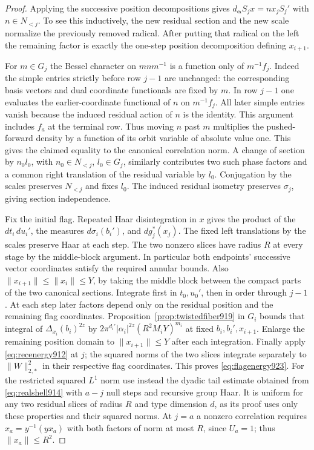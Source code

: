 \documentclass[a4paper,11pt]{article}
\theoremstyle{definition}
\theoremstyle{remark}
\numberwithin{equation}{section}
\begin{document}
\begin{proof}
Applying the successive position decompositions gives
\(d_{\boldsymbol\alpha}S_j x=n x_j S_j'\) with \(n\in N_{<j}\).
To see this inductively, the new residual section and the new
scale normalize the previously removed radical. After putting
that radical on the left the remaining factor is exactly the
one-step position decomposition defining \(x_{i+1}\).

For \(m\in G_j\) the Bessel character on \(m n m^{-1}\) is a
function only of \(m^{-1}f_j\). Indeed the simple entries
strictly before row \(j-1\) are unchanged: the corresponding
basis vectors and dual coordinate functionals are fixed by
\(m\). In row \(j-1\) one evaluates the earlier-coordinate
functional of \(n\) on \(m^{-1}f_j\). All later simple entries
vanish because the induced residual action of \(n\) is the
identity. This argument includes \(f_a\) at the terminal row.
Thus moving \(n\) past \(m\) multiplies the pushed-forward
density by a function of its orbit variable of absolute value
one. This gives the claimed equality to the canonical
correlation norm. A change of section by \(n_0l_0\), with
\(n_0\in N_{<j}\), \(l_0\in G_j\), similarly contributes
two such phase factors and a common right translation of the
residual variable by \(l_0\). Conjugation by the scales preserves
\(N_{<j}\) and fixes \(l_0\). The induced residual isometry
preserves \(\sigma_j\), giving section independence.

Fix the initial flag. Repeated Haar disintegration in \(x\)
gives the product of the \(dt_i\,du_i'\), the measures
\(d\sigma_i(b_i')\), and \(dg_j^*(x_j)\). The fixed left
translations by the scales preserve Haar at each step.
The two nonzero slices have radius \(R\) at every stage by the
middle-block argument. In particular both endpoints' successive
vector coordinates satisfy the required annular bounds.
Also \(\|x_{i+1}\|\le\|x_i\|\le Y\), by taking the middle block
between the compact parts of the two canonical sections.
Integrate first in \(t_0,u_0'\), then in order through \(j-1\).
At each step later factors depend only on the residual position
and the remaining flag coordinates. Proposition~\ref{prop:twistedfiber919}
in \(G_i\) bounds that integral of \(\Delta_{x_i}(b_i)^{2z}\)
by \(2\pi^{d_i'}|\alpha_i|^{2z}(R^2M_iY)^{m_i}\) at fixed
\(b_i,b_i',x_{i+1}\). Enlarge the remaining position domain to
\(\|x_{i+1}\|\le Y\) after each integration. Finally apply
\eqref{eq:recenergy912} at \(j\); the squared norms of the
two slices integrate separately to \(\|W\|_{2,*}^2\) in
their respective flag coordinates. This proves \eqref{eq:flagenergy923}.
For the restricted squared \(L^1\) norm use instead the
dyadic tail estimate obtained from \eqref{eq:realshell914}
with \(a-j\) null steps and recursive group Haar. It is uniform
for any two residual slices of radius \(R\) and type dimension
\(d\), as its proof uses only these properties and their squared
norms. At \(j=a\) a nonzero correlation requires
\(x_a=y^{-1}(yx_a)\) with both factors of norm at most \(R\),
since \(U_a=1\); thus \(\|x_a\|\le R^2\).
\end{proof}
\end{document}
